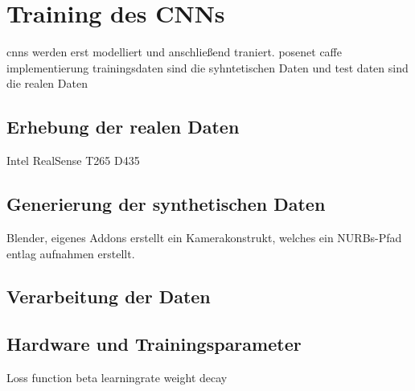 
\section{Training des CNNs}
cnns werden erst modelliert und anschließend traniert.
posenet caffe implementierung
trainingsdaten sind die syhntetischen Daten und test daten sind die realen Daten


\subsection{Erhebung der realen Daten}
Intel RealSense T265 D435

\subsection{Generierung der synthetischen Daten}
Blender,
eigenes Addons erstellt ein Kamerakonstrukt, welches ein NURBs-Pfad entlag aufnahmen erstellt.

\subsection{Verarbeitung der Daten}


\subsection{Hardware und Trainingsparameter}

Loss function beta
learningrate
weight decay